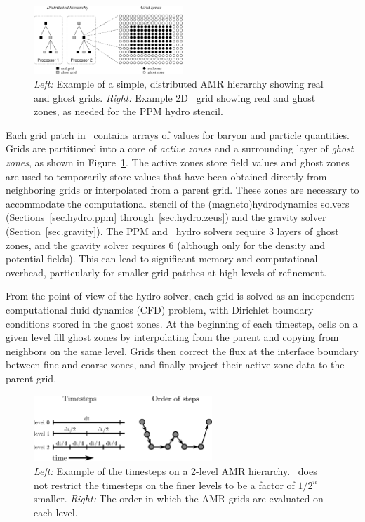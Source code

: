 \begin{figure}
\begin{center}
\includegraphics[width=0.5\textwidth]{figures/amr_hierarchy.eps}
\end{center}
\caption{\emph{Left:} Example of a simple, distributed AMR hierarchy
showing real and ghost grids.  \emph{Right:} Example 2D \enzo\ grid
showing real and ghost zones, as needed for the PPM hydro stencil. }
\label{fig.amr_hierarchy}
\end{figure}

Each grid patch in \enzo\ contains arrays of values for baryon and
particle quantities.   Grids are partitioned into a core of
\emph{active zones} and a surrounding layer of \emph{ghost zones}, as
shown in Figure~\ref{fig.amr_hierarchy}.  The active zones store field
values and ghost zones are used to temporarily store values that have
been obtained directly from neighboring grids or interpolated from a
parent grid.  These zones are necessary to accommodate the
computational stencil of the (magneto)hydrodynamics solvers
(Sections~\ref{sec.hydro.ppm} through~\ref{sec.hydro.zeus}) and the
gravity solver (Section~\ref{sec.gravity}).  The PPM and \zeus\ hydro
solvers require 3 layers of ghost zones,  and the gravity solver
requires 6 (although only for the density and potential fields).  This
can lead to significant memory and computational overhead,
particularly for smaller grid patches at high levels of refinement.  


From the point of view of the hydro solver, each grid is solved as an
independent computational fluid dynamics (CFD) problem, with Dirichlet
boundary conditions stored in the ghost zones.  At the beginning of
each timestep, cells on a given level fill ghost zones by
interpolating from the parent and copying from neighbors on the same
level.  Grids then correct the flux at the interface boundary between
fine and coarse zones, and finally project their active zone data to
the parent grid. 

\begin{figure}
\begin{center}
\includegraphics[width=0.6\textwidth]{figures/timestepping.eps}
\end{center}
\caption{\emph{Left:} Example of the timesteps on a 2-level AMR
  hierarchy.  \enzo\ does not restrict the timesteps on the finer levels
  to be a factor of $1/2^n$ smaller.  \emph{Right:} The order in which
  the AMR grids are evaluated on each level.\vspace{1ex}}
\label{fig:wcycle}
\end{figure}

